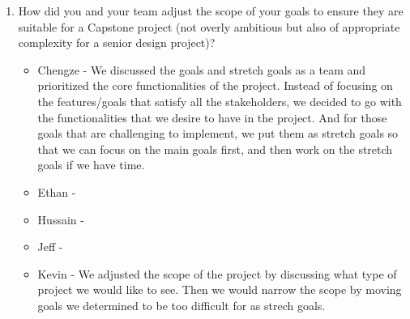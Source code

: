 \documentclass{article}
\begin{document}
\begin{enumerate}
    \item How did you and your team adjust the scope of your goals to ensure
    they are suitable for a Capstone project (not overly ambitious but also of
    appropriate complexity for a senior design project)?
    \begin{itemize}
        \item Chengze - We discussed the goals and stretch goals 
        as a team and prioritized the core functionalities of the 
        project. Instead of focusing on the features/goals that 
        satisfy all the stakeholders, we decided to go with the 
        functionalities that we desire to have in the project. 
        And for those goals that are challenging to implement, 
        we put them as stretch goals so that we can focus on the 
        main goals first, and then work on the stretch goals if 
        we have time.
        \item Ethan - 
        \item Hussain -
        \item Jeff - 
        \item Kevin - We adjusted the scope of the project by discussing what 
        type of project we would like to see. Then we would narrow the scope 
        by moving goals we determined to be too difficult for as strech goals. 
    \end{itemize}
\end{enumerate}  
\end{document}
